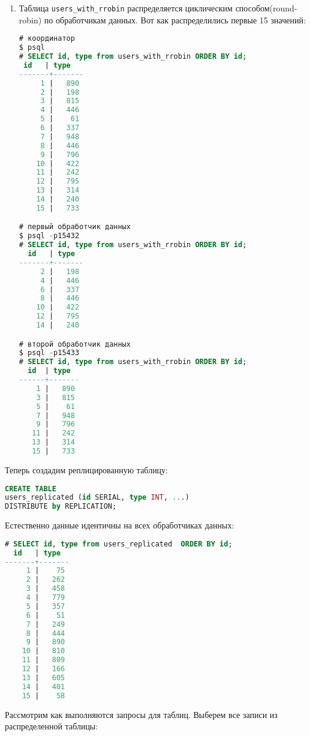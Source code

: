 \begin{enumerate}
  \item Таблица \lstinline!users_with_rrobin! распределяется циклическим способом(round-robin) по обработчикам данных. Вот как распределились первые 15 значений:

\begin{lstlisting}[language=SQL,label=lst:postgres-x25,caption=Данные с координатора и обработчиков данных]
# координатор
$ psql
# SELECT id, type from users_with_rrobin ORDER BY id;
 id   | type
-------+-------
     1 |   890
     2 |   198
     3 |   815
     4 |   446
     5 |    61
     6 |   337
     7 |   948
     8 |   446
     9 |   796
    10 |   422
    11 |   242
    12 |   795
    13 |   314
    14 |   240
    15 |   733

# первый обработчик данных
$ psql -p15432
# SELECT id, type from users_with_rrobin ORDER BY id;
  id   | type
-------+-------
     2 |   198
     4 |   446
     6 |   337
     8 |   446
    10 |   422
    12 |   795
    14 |   240

# второй обработчик данных
$ psql -p15433
# SELECT id, type from users_with_rrobin ORDER BY id;
  id  | type
------+-------
    1 |   890
    3 |   815
    5 |    61
    7 |   948
    9 |   796
   11 |   242
   13 |   314
   15 |   733
\end{lstlisting}

\end{enumerate}

Теперь создадим реплицированную таблицу:

\begin{lstlisting}[language=SQL,label=lst:postgres-x220,caption=Создание реплицированной таблицы]
CREATE TABLE
users_replicated (id SERIAL, type INT, ...)
DISTRIBUTE by REPLICATION;
\end{lstlisting}

Естественно данные идентичны на всех обработчиках данных:

\begin{lstlisting}[language=SQL,label=lst:postgres-x221,caption=Данные с координатора и обработчиков данных]
# SELECT id, type from users_replicated  ORDER BY id;
  id   | type
-------+-------
     1 |    75
     2 |   262
     3 |   458
     4 |   779
     5 |   357
     6 |    51
     7 |   249
     8 |   444
     9 |   890
    10 |   810
    11 |   809
    12 |   166
    13 |   605
    14 |   401
    15 |    58
\end{lstlisting}

Рассмотрим как выполняются запросы для таблиц. Выберем все записи из распределенной таблицы:

